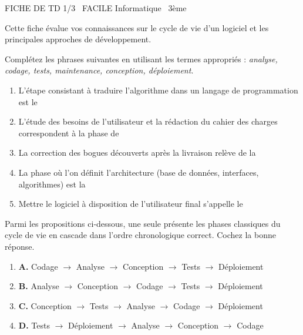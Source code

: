 \documentclass[11pt]{article}
\begin{document}
\begin{tcolorbox}[enhanced,colback=popink,colframe=popink,arc=10pt,boxrule=0pt,left=12pt,right=12pt,top=9pt,bottom=9pt]
{\color{white}\popxbold\small FICHE DE TD 1/3 \textbullet\ FACILE \hfill Informatique \textbullet\ 3ème\par}
\end{tcolorbox}
\vspace{4pt}
Cette fiche évalue vos connaissances sur le cycle de vie d'un logiciel et les principales approches de développement.

\begin{exercice}
\label{exo:vocab}
Complétez les phrases suivantes en utilisant les termes appropriés : \textit{analyse, codage, tests, maintenance, conception, déploiement}.
\begin{enumerate}
    \item L'étape consistant à traduire l'algorithme dans un langage de programmation est le \dotfill
    \item L'étude des besoins de l'utilisateur et la rédaction du cahier des charges correspondent à la phase de \dotfill
    \item La correction des bogues découverts après la livraison relève de la \dotfill
    \item La phase où l'on définit l'architecture (base de données, interfaces, algorithmes) est la \dotfill
    \item Mettre le logiciel à disposition de l'utilisateur final s'appelle le \dotfill
\end{enumerate}
\end{exercice}

\begin{exercice}
\label{exo:ordre}
Parmi les propositions ci-dessous, une seule présente les phases classiques du cycle de vie en cascade dans l'ordre chronologique correct. Cochez la bonne réponse.
\begin{enumerate}
    \item \textbf{A.} Codage $\rightarrow$ Analyse $\rightarrow$ Conception $\rightarrow$ Tests $\rightarrow$ Déploiement
    \item \textbf{B.} Analyse $\rightarrow$ Conception $\rightarrow$ Codage $\rightarrow$ Tests $\rightarrow$ Déploiement
    \item \textbf{C.} Conception $\rightarrow$ Tests $\rightarrow$ Analyse $\rightarrow$ Codage $\rightarrow$ Déploiement
    \item \textbf{D.} Tests $\rightarrow$ Déploiement $\rightarrow$ Analyse $\rightarrow$ Conception $\rightarrow$ Codage
\end{enumerate}
\end{exercice}
\end{document}
